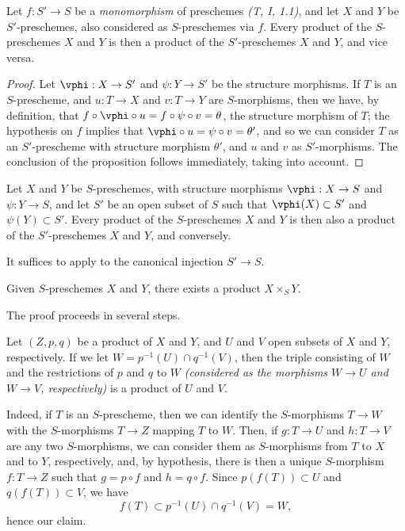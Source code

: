 \begin{proposition}[3.2.4]
\label{I.3.2.4}
Let $f:S'\to S$ be a \emph{monomorphism} of preschemes \emph{(T, I, 1.1)}, and let $X$ and $Y$ be
$S'$-preschemes, also considered as $S$-preschemes via $f$. Every product of
the $S$-preschemes $X$ and $Y$ is then a product of the $S'$-preschemes $X$ and $Y$, and vice versa.
\end{proposition}

\begin{proof}
Let $\vphi:X\to S'$ and $\psi:Y\to S'$ be the structure morphisms. If $T$ is an $S$-prescheme, and
$u:T\to X$ and $v:T\to Y$ are $S$-morphisms, then we have, by definition, that
$f\circ\vphi\circ u=f\circ\psi\circ v=\theta$, the structure morphism of $T$; the hypothesis
on $f$ implies that $\vphi\circ u=\psi\circ v=\theta'$, and so we can consider $T$ as an
$S'$-prescheme with structure morphism $\theta'$, and $u$ and $v$ as $S'$-morphisms. The
conclusion of the proposition follows immediately, taking  into account.
\end{proof}

\begin{corollary}[3.2.5]
\label{I.3.2.5}
Let $X$ and $Y$ be $S$-preschemes, with structure morphisms $\vphi:X\to S$ and $\psi:Y\to S$, and let
$S'$ be an open subset of $S$ such that $\vphi(X)\subset S'$ and $\psi(Y)\subset S'$. Every product
of the $S$-preschemes $X$ and $Y$ is then also a product of the $S'$-preschemes $X$ and $Y$, and
conversely.
\end{corollary}

It suffices to apply  to the canonical injection $S'\to S$.

\begin{theorem}[3.2.6]
\label{I.3.2.6}
Given $S$-preschemes $X$ and $Y$, there exists a product $X\times_S Y$.
\end{theorem}

The proof proceeds in several steps.
\begin{lemma}[3.2.6.1]
\label{I.3.2.6.1}
Let $(Z,p,q)$ be a product of $X$ and $Y$, and $U$ and $V$ open subsets of $X$ and $Y$,
respectively. If we let $W=p^{-1}(U)\cap q^{-1}(V)$, then the triple consisting of $W$ and
the restrictions of $p$ and $q$ to $W$ \emph{(considered as the morphisms $W\to U$ and $W\to V$,
respectively)} is a product of $U$ and $V$.
\end{lemma}

Indeed, if $T$ is an $S$-prescheme, then we can identify the $S$-morphisms $T\to W$ with the
$S$-morphisms $T\to Z$ mapping $T$ to $W$. Then, if $g:T\to U$ and $h:T\to V$ are any two
$S$-morphisms, we can consider them as $S$-morphisms from $T$ to $X$ and to $Y$, respectively,
and, by hypothesis, there is then a unique $S$-morphism $f:T\to Z$ such that $g=p\circ f$ and
$h=q\circ f$. Since $p(f(T))\subset U$ and $q(f(T))\subset V$, we have
\[
  f(T)\subset p^{-1}(U)\cap q^{-1}(V)=W,
\]
hence our claim.

